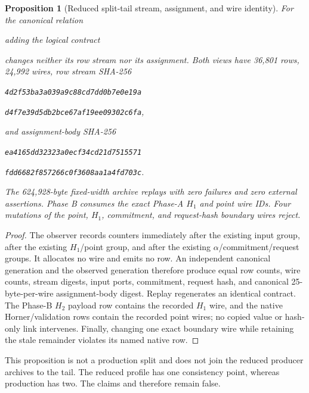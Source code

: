 \documentclass[11pt]{article}
\newtheorem{proposition}[definition]{Proposition}
\begin{document}
\begin{proposition}[Reduced split-tail stream, assignment, and wire identity]
For the canonical relation
\begin{center}
\end{center}
adding the logical contract
\begin{center}
\end{center}
changes neither its row stream nor its assignment.  Both views have 36,801
rows, 24,992 wires, row
stream SHA-256
\begin{center}
\texttt{4d2f53ba3a039a9c88cd7dd0b7e0e19a}\par\vspace{-0.2em}
\texttt{d4f7e39d5db2bce67af19ee09302c6fa},
\end{center}
and assignment-body SHA-256
\begin{center}
\texttt{ea4165dd32323a0ecf34cd21d7515571}\par\vspace{-0.2em}
\texttt{fdd6682f857266c0f3608aa1a4fd703c}.
\end{center}
The 624,928-byte fixed-width archive replays with zero failures and zero
external assertions.  Phase B consumes the exact Phase-A $H_1$ and point wire
IDs.  Four mutations of the point, $H_1$, commitment, and request-hash boundary
wires reject.
\end{proposition}
\begin{proof}
The observer records counters immediately after the existing input group,
after the existing $H_1$/point group, and after the existing
$\alpha$/commitment/request groups.  It allocates no wire and emits no row.
An independent canonical generation and the observed generation therefore
produce equal row counts, wire counts, stream digests, input ports, commitment,
request hash, and canonical 25-byte-per-wire assignment-body digest.  Replay
regenerates an identical contract.  The Phase-B $H_2$ payload row contains the
recorded $H_1$ wire, and the native Horner/validation rows contain the recorded
point wires; no copied value or hash-only link intervenes.  Finally, changing
one exact boundary wire while retaining the stale remainder violates its named
native row.
\end{proof}

This proposition is not a production split and does not join the reduced
producer archives to the tail.  The reduced profile has one consistency point,
whereas production has two.  The claims
 and
 therefore remain false.
\end{document}
